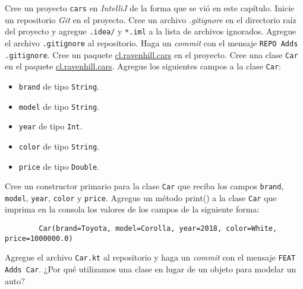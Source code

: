   \begin{Exercise}
    \Question Cree un proyecto \texttt{cars} en \textit{IntelliJ} de la forma que se vió en 
      este capítulo.
    \Question Inicie un repositorio \textit{Git} en el proyecto.
    \Question Cree un archivo \textit{.gitignore} en el directorio raíz del proyecto y agregue
      \texttt{.idea/} y \texttt{*.iml} a la lista de archivos ignorados.
    \Question Agregue el archivo \texttt{.gitignore} al repositorio.
    \Question Haga un \textit{commit} con el mensaje \texttt{REPO Adds .gitignore}.
    \Question Cree un paquete \url{cl.ravenhill.cars} en el proyecto.
    \Question Cree una clase \texttt{Car} en el paquete \url{cl.ravenhill.cars}.
    \Question Agregue los siguientes campos a la clase \texttt{Car}:
      \begin{itemize}
        \item \texttt{brand} de tipo \texttt{String}.
        \item \texttt{model} de tipo \texttt{String}.
        \item \texttt{year} de tipo \texttt{Int}.
        \item \texttt{color} de tipo \texttt{String}.
        \item \texttt{price} de tipo \texttt{Double}.
      \end{itemize}
    \Question Cree un constructor primario para la clase \texttt{Car} que reciba los campos
      \texttt{brand}, \texttt{model}, \texttt{year}, \texttt{color} y \texttt{price}.
    \Question Agregue un método \textrm{print()} a la clase \texttt{Car} que imprima en la
      consola los valores de los campos de la siguiente forma:
      \begin{verbatim}
        Car(brand=Toyota, model=Corolla, year=2018, color=White, price=1000000.0)
      \end{verbatim}
    \Question Agregue el archivo \texttt{Car.kt} al repositorio y haga un \textit{commit}
      con el mensaje \texttt{FEAT Adds Car}.
    \Question ¿Por qué utilizamos una clase en lugar de un objeto para modelar un auto?
  \end{Exercise}